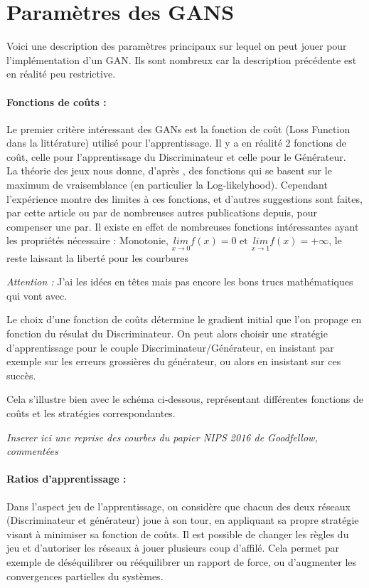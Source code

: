 \section{Paramètres des GANS}

	Voici une description des paramètres principaux sur lequel on peut jouer pour l'implémentation d'un GAN. Ils sont nombreux car la description précédente est en réalité peu restrictive.

	\paragraph*{Fonctions de coûts : } 
		Le premier critère intéressant des GANs est la fonction de coût (Loss Function dans la littérature) utilisé pour l'apprentissage. Il y a en réalité 2 fonctions de coût, celle pour l'apprentissage du Discriminateur et celle pour le Générateur. \\
		La théorie des jeux nous donne, d'après \cite{Goodfellow-et-al-2016}, des fonctions qui se basent sur le maximum de vraisemblance (en particulier la Log-likelyhood). Cependant l'expérience montre des limites à ces fonctions, et d'autres suggestions sont faites, par cette article ou par de nombreuses autres publications depuis, pour compenser une par. Il existe en effet de nombreuses fonctions intéressantes ayant les propriétés nécessaire : Monotonie, $\underset{x\rightarrow0}{lim} f(x) = 0 \text{ et } \underset{x\rightarrow 1}{lim} f(x) = +\infty$, le reste laissant la liberté pour les courbures

		\emph{Attention : } J'ai les idées en têtes mais pas encore les bons trucs mathématiques qui vont avec.  

		Le choix d'une fonction de coûts détermine le gradient initial que l'on propage en fonction du résulat du Discriminateur. On peut alors choisir une stratégie d'apprentissage pour le couple Discriminateur/Générateur, en insistant par exemple sur les erreurs grossières du générateur, ou alors en insistant sur ces succès.

		Cela s'illustre bien avec le schéma ci-dessous, représentant différentes fonctions de coûts et les stratégies correspondantes.

		\emph{Inserer ici une reprise des courbes du papier NIPS 2016 de Goodfellow, commentées}

	\paragraph*{Ratios d'apprentissage : } Dans l'aspect jeu de l'apprentissage, on considère que chacun des deux réseaux (Discriminateur et générateur) joue à son tour, en appliquant sa propre stratégie visant à minimiser sa fonction de coûts. Il est possible de changer les règles du jeu et d'autoriser les réseaux à jouer plusieurs coup d'affilé. Cela permet par exemple de déséquilibrer ou rééquilibrer un rapport de force, ou d'augmenter les convergences partielles du systèmes.


